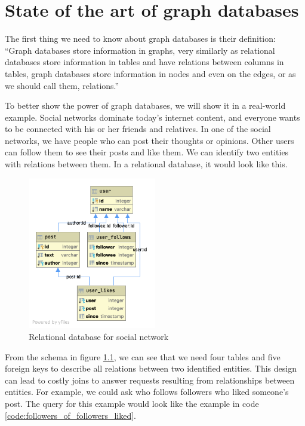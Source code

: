 \chapter {State of the art of graph databases}

The first thing we need to know about graph databases is their definition:
``Graph databases store information in graphs, very similarly as relational databases store information in tables and have relations between columns in tables, graph databases store information in nodes and even on the edges, or as we should call them, relations.'' \cite{morgante_what_2021}

To better show the power of graph databases, we will show it in a real-world example.
Social networks dominate today's internet content, and everyone wants to be connected with his or her friends and relatives.
In one of the social networks, we have people who can post their thoughts or opinions.
Other users can follow them to see their posts and like them.
We can identify two entities with relations between them.
In a relational database, it would look like this.

\begin{figure}[H]
	\centering
	\includegraphics[width=0.5\textwidth]{content/thesis-db.png}
	\caption{Relational database for social network}
	\label{fig:relscheme}
\end{figure}

From the schema in figure \ref{fig:relscheme}, we can see that we need four tables and five foreign keys to describe all relations between two identified entities.
This design can lead to costly joins to answer requests resulting from relationships between entities.
For example, we could ask who follows followers who liked someone's post.
The query for this example would look like the example in code \ref{code:followers_of_followers_liked}.

